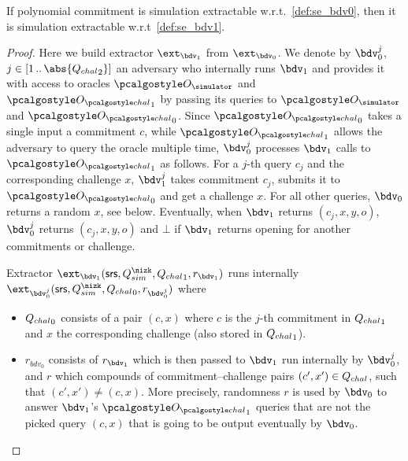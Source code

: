 \documentclass[runningheads,11pt]{llncs}
\begin{document}
\begin{lemma}[]
  If polynomial commitment is simulation extractable w.r.t.~\cref{def:se_bdv0}, then
  it is simulation extractable w.r.t~\cref{def:se_bdv1}.
\end{lemma}
\begin{proof}
  Here we build extractor $\ext_{\bdv_1}$ from $\ext_{\bdv_0}$. We denote by
  $\bdv_0^{j}$, $j \in \range{1}{\abs{\Qchal_2}}$ an adversary who internally runs
  $\bdv_1$ and provides it with access to oracles $\oracles$ and $\oraclec_1$ by
  passing its queries to $\oracles$ and $\oraclec_0$. Since $\oraclec_0$ takes a
  single input a commitment $c$, while $\oraclec_1$ allows the adversary to query the
  oracle multiple time, $\bdv_0^{j}$ processes $\bdv_1$ calls to $\oraclec_1$ as
  follows. For a $j$-th query $c_j$ and the corresponding challenge $x$, $\bdv_1^{j}$
  takes commitment $c_j$, submits it to $\oraclec_0$ and get a challenge $x$. For all
  other queries, $\bdv_0$ returns a random $x$, see below. Eventually, when $\bdv_1$ returns
  $(c_j, x, y, o)$, $\bdv_0^{j}$ returns $(c_j, x, y, o)$ and $\bot$ if $\bdv_1$
  returns opening for another commitments or challenge.

  Extractor $\ext_{\bdv_1} (\srs, \Qsim, \Qchal_1, r_{\bdv_1})$ runs internally
  $\ext_{\bdv_0^j} (\srs, \Qsim, \Qchal_0, r_{\bdv_0^j})$ where
  \begin{itemize}
  \item ${Q_{chal}}_0$ consists of a pair $(c, x)$ where $c$ is the $j$-th commitment in
    ${Q_{chal}}_1$ and $x$ the corresponding challenge (also stored in ${Q_{chal}}_1$).
  \item $r_{bdv_0}$ consists of $r_{\bdv_1}$ which is then passed to $\bdv_1$ run
    internally by $\bdv_0^j$, and $r$ which compounds of commitment--challenge pairs
    $(c', x') \in {Q_{chal}}$, such that $(c', x') \neq (c, x)$. More precisely,
    randomness $r$ is used by $\bdv_0$ to answer $\bdv_1$'s $\oraclec_1$ queries that
    are not the picked query $(c, x)$ that is going to be output eventually by $\bdv_0$. 
  \end{itemize}
\end{proof}
\end{document}
